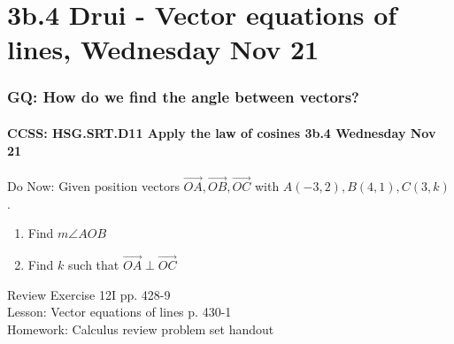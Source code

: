 \documentclass{beamer}
\begin{document}
    \section{3b.4 Drui - Vector equations of lines, Wednesday Nov 21}
      \frame
      {
        \frametitle{GQ: How do we find the angle between vectors?}
        \framesubtitle{CCSS: HSG.SRT.D11 Apply the law of cosines \qquad \alert{3b.4 Wednesday Nov 21}}

        \begin{block}{Do Now: Given position vectors $\overrightarrow{OA}, \overrightarrow{OB}, \overrightarrow{OC}$ with $A(-3,2),B(4,1),C(3,k)$.}
            \begin{center}
            \end{center}
          \begin{enumerate}
              \item Find $m\angle AOB$
              \item Find $k$ such that $\overrightarrow{OA} \perp \overrightarrow{OC}$
          \end{enumerate}
        \end{block}

        Review Exercise 12I pp. 428-9\\
        Lesson: Vector equations of lines p. 430-1\\
        Homework: Calculus review problem set handout
      }
\end{document}
